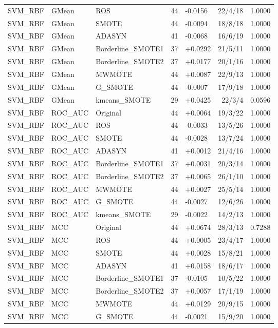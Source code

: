 \documentclass[10pt,a4paper]{article}
\begin{document}
\begin{longtable}{lllllrr}
SVM\_RBF & GMean & ROS & 44 & -0.0156 & 22/4/18 & 1.0000 \\
SVM\_RBF & GMean & SMOTE & 44 & -0.0094 & 18/8/18 & 1.0000 \\
SVM\_RBF & GMean & ADASYN & 41 & -0.0068 & 16/6/19 & 1.0000 \\
SVM\_RBF & GMean & Borderline\_SMOTE1 & 37 & +0.0292 & 21/5/11 & 1.0000 \\
SVM\_RBF & GMean & Borderline\_SMOTE2 & 37 & +0.0177 & 20/1/16 & 1.0000 \\
SVM\_RBF & GMean & MWMOTE & 44 & +0.0087 & 22/9/13 & 1.0000 \\
SVM\_RBF & GMean & G\_SMOTE & 44 & -0.0007 & 17/9/18 & 1.0000 \\
SVM\_RBF & GMean & kmeans\_SMOTE & 29 & +0.0425 & 22/3/4 & 0.0596 \\
SVM\_RBF & ROC\_AUC & Original & 44 & +0.0064 & 19/3/22 & 1.0000 \\
SVM\_RBF & ROC\_AUC & ROS & 44 & -0.0033 & 13/5/26 & 1.0000 \\
SVM\_RBF & ROC\_AUC & SMOTE & 44 & -0.0028 & 13/7/24 & 1.0000 \\
SVM\_RBF & ROC\_AUC & ADASYN & 41 & +0.0012 & 21/4/16 & 1.0000 \\
SVM\_RBF & ROC\_AUC & Borderline\_SMOTE1 & 37 & +0.0031 & 20/3/14 & 1.0000 \\
SVM\_RBF & ROC\_AUC & Borderline\_SMOTE2 & 37 & +0.0065 & 26/1/10 & 1.0000 \\
SVM\_RBF & ROC\_AUC & MWMOTE & 44 & +0.0027 & 25/5/14 & 1.0000 \\
SVM\_RBF & ROC\_AUC & G\_SMOTE & 44 & -0.0027 & 12/6/26 & 1.0000 \\
SVM\_RBF & ROC\_AUC & kmeans\_SMOTE & 29 & -0.0022 & 14/2/13 & 1.0000 \\
SVM\_RBF & MCC & Original & 44 & +0.0674 & 28/3/13 & 0.7288 \\
SVM\_RBF & MCC & ROS & 44 & +0.0005 & 23/4/17 & 1.0000 \\
SVM\_RBF & MCC & SMOTE & 44 & +0.0028 & 15/8/21 & 1.0000 \\
SVM\_RBF & MCC & ADASYN & 41 & +0.0158 & 18/6/17 & 1.0000 \\
SVM\_RBF & MCC & Borderline\_SMOTE1 & 37 & -0.0105 & 10/5/22 & 1.0000 \\
SVM\_RBF & MCC & Borderline\_SMOTE2 & 37 & +0.0057 & 17/1/19 & 1.0000 \\
SVM\_RBF & MCC & MWMOTE & 44 & +0.0129 & 20/9/15 & 1.0000 \\
SVM\_RBF & MCC & G\_SMOTE & 44 & -0.0021 & 15/9/20 & 1.0000 \\

\end{longtable}
\end{document}

